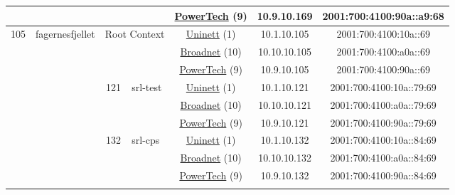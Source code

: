 \begin{small}
\begin{center}
\begin{longtable}{|c|c|c|c|c|c|c|c|}
  &  &  &  & \multicolumn{2}{|c|}{\tiny{\href{http://www.powertech.no}{PowerTech} (9)}} & \tiny{10.9.10.169} & \tiny{2001:700:4100:90a::a9:68} \\ \hline
 \multirow{27}{*}{\tiny{105}} & \multicolumn{1}{|l|}{\multirow{27}{*}{\tiny{fagernesfjellet}}} & \multicolumn{2}{|c|}{\multirow{3}{*}{\tiny{Root Context}}} & \multicolumn{2}{|c|}{\tiny{\href{https://www.uninett.no}{Uninett} (1)}} & \tiny{10.1.10.105} & \tiny{2001:700:4100:10a::69} \\* \cline{5-5}\cline{6-6}\cline{7-7}\cline{8-8}
  &  & \multicolumn{2}{|c|}{} & \multicolumn{2}{|c|}{\tiny{\href{https://www.broadnet.no}{Broadnet} (10)}} & \tiny{10.10.10.105} & \tiny{2001:700:4100:a0a::69} \\* \cline{5-5}\cline{6-6}\cline{7-7}\cline{8-8}
  &  & \multicolumn{2}{|c|}{} & \multicolumn{2}{|c|}{\tiny{\href{http://www.powertech.no}{PowerTech} (9)}} & \tiny{10.9.10.105} & \tiny{2001:700:4100:90a::69} \\* \cline{3-3}\cline{4-4}\cline{5-5}\cline{6-6}\cline{7-7}\cline{8-8}
  &  & \multirow{3}{*}{\tiny{121}} & \multicolumn{1}{|l|}{\multirow{3}{*}{\tiny{srl-test}}} & \multicolumn{2}{|c|}{\tiny{\href{https://www.uninett.no}{Uninett} (1)}} & \tiny{10.1.10.121} & \tiny{2001:700:4100:10a::79:69} \\* \cline{5-5}\cline{6-6}\cline{7-7}\cline{8-8}
  &  &  &  & \multicolumn{2}{|c|}{\tiny{\href{https://www.broadnet.no}{Broadnet} (10)}} & \tiny{10.10.10.121} & \tiny{2001:700:4100:a0a::79:69} \\* \cline{5-5}\cline{6-6}\cline{7-7}\cline{8-8}
  &  &  &  & \multicolumn{2}{|c|}{\tiny{\href{http://www.powertech.no}{PowerTech} (9)}} & \tiny{10.9.10.121} & \tiny{2001:700:4100:90a::79:69} \\* \cline{3-3}\cline{4-4}\cline{5-5}\cline{6-6}\cline{7-7}\cline{8-8}
  &  & \multirow{3}{*}{\tiny{132}} & \multicolumn{1}{|l|}{\multirow{3}{*}{\tiny{srl-cps}}} & \multicolumn{2}{|c|}{\tiny{\href{https://www.uninett.no}{Uninett} (1)}} & \tiny{10.1.10.132} & \tiny{2001:700:4100:10a::84:69} \\* \cline{5-5}\cline{6-6}\cline{7-7}\cline{8-8}
  &  &  &  & \multicolumn{2}{|c|}{\tiny{\href{https://www.broadnet.no}{Broadnet} (10)}} & \tiny{10.10.10.132} & \tiny{2001:700:4100:a0a::84:69} \\* \cline{5-5}\cline{6-6}\cline{7-7}\cline{8-8}
  &  &  &  & \multicolumn{2}{|c|}{\tiny{\href{http://www.powertech.no}{PowerTech} (9)}} & \tiny{10.9.10.132} & \tiny{2001:700:4100:90a::84:69} \\* \cline{3-3}\cline{4-4}\cline{5-5}\cline{6-6}\cline{7-7}\cline{8-8}

\end{longtable}
\end{center}
\end{small}
